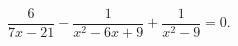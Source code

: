 \begin{ex}[type=equation]
	\begin{condition}
		$\dfrac{6}{7x -21} - \dfrac{1}{x^2 - 6x + 9} + \dfrac{1}{x^2 - 9} = 0.$
	\end{condition}
\end{ex}